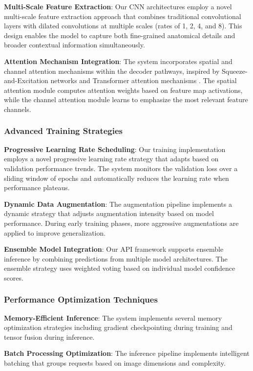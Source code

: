\documentclass[12pt,a4paper]{article}
\begin{document}
\textbf{Multi-Scale Feature Extraction}: Our CNN architectures employ a novel multi-scale feature extraction approach that combines traditional convolutional layers with dilated convolutions at multiple scales (rates of 1, 2, 4, and 8). This design enables the model to capture both fine-grained anatomical details and broader contextual information simultaneously.

\textbf{Attention Mechanism Integration}: The system incorporates spatial and channel attention mechanisms within the decoder pathways, inspired by Squeeze-and-Excitation networks \cite{hu2018squeeze} and Transformer attention mechanisms \cite{vaswani2017attention}. The spatial attention module computes attention weights based on feature map activations, while the channel attention module learns to emphasize the most relevant feature channels.

\subsubsection{Advanced Training Strategies}

\textbf{Progressive Learning Rate Scheduling}: Our training implementation employs a novel progressive learning rate strategy that adapts based on validation performance trends. The system monitors the validation loss over a sliding window of epochs and automatically reduces the learning rate when performance plateaus.

\textbf{Dynamic Data Augmentation}: The augmentation pipeline implements a dynamic strategy that adjusts augmentation intensity based on model performance. During early training phases, more aggressive augmentations are applied to improve generalization.

\textbf{Ensemble Model Integration}: Our API framework supports ensemble inference by combining predictions from multiple model architectures. The ensemble strategy uses weighted voting based on individual model confidence scores.

\subsubsection{Performance Optimization Techniques}

\textbf{Memory-Efficient Inference}: The system implements several memory optimization strategies including gradient checkpointing during training and tensor fusion during inference.

\textbf{Batch Processing Optimization}: The inference pipeline implements intelligent batching that groups requests based on image dimensions and complexity.
\end{document}
